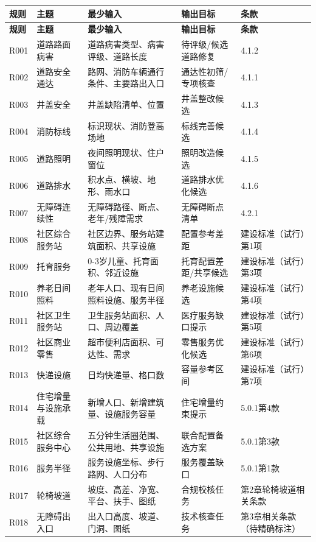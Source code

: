 \documentclass[UTF8,11pt,fontset=windows]{ctexart}
\begin{document}
{\small
\begin{longtable}{@{}L{13mm}L{32mm}L{47mm}L{43mm}L{19mm}@{}}
\toprule
\textbf{规则} & \textbf{主题} & \textbf{最少输入} & \textbf{输出目标} & \textbf{条款}\\
\midrule\endfirsthead
\toprule\textbf{规则} & \textbf{主题} & \textbf{最少输入} & \textbf{输出目标} & \textbf{条款}\\
\midrule\endhead
R001 & 道路路面病害 & 道路病害类型、病害评级、道路长度 & 待评级/候选道路修复 & 4.1.2\\
R002 & 道路安全通达 & 路网、消防车辆通行条件、主要路出入口 & 通达性初筛/专项核查 & 4.1.1\\
R003 & 井盖安全 & 井盖缺陷清单、位置 & 井盖整改候选 & 4.1.3\\
R004 & 消防标线 & 标识现状、消防登高场地 & 标线完善候选 & 4.1.4\\
R005 & 道路照明 & 夜间照明现状、住户窗位 & 照明改造候选 & 4.1.5\\
R006 & 道路排水 & 积水点、横坡、地形、雨水口 & 道路排水优化候选 & 4.1.6\\
R007 & 无障碍连续性 & 无障碍路径、断点、老年/残障需求 & 无障碍断点清单 & 4.2.1\\
R008 & 社区综合服务站 & 社区边界、服务站建筑面积、共享设施 & 配置参考差距 & 建设标准（试行）第1项\\
R009 & 托育服务 & 0-3岁儿童、托育面积、邻近设施 & 托育配置差距/共享候选 & 建设标准（试行）第3项\\
R010 & 养老日间照料 & 老年人口、现有日间照料设施、服务半径 & 养老设施候选 & 建设标准（试行）第4项\\
R011 & 社区卫生服务站 & 卫生服务站面积、人口、周边覆盖 & 医疗服务缺口提示 & 建设标准（试行）第5项\\
R012 & 社区商业零售 & 超市便利店面积、可达性、需求 & 零售服务优化候选 & 建设标准（试行）第6项\\
R013 & 快递设施 & 日均快递量、格口数 & 容量参考区间 & 建设标准（试行）第7项\\
R014 & 住宅增量与设施承载 & 新增人口、新增建筑量、设施服务容量 & 住宅增量约束提示 & 5.0.1第4款\\
R015 & 社区综合服务中心 & 五分钟生活圈范围、公共用地、共享设施 & 联合配置备选方案 & 5.0.1第3款\\
R016 & 服务半径 & 服务设施坐标、步行路网、人口分布 & 服务覆盖缺口 & 5.0.1第1款\\
R017 & 轮椅坡道 & 坡度、高差、净宽、平台、扶手、图纸 & 合规校核任务 & 第2章轮椅坡道相关条款\\
R018 & 无障碍出入口 & 出入口高度、坡道、门洞、图纸 & 技术核查任务 & 第3章相关条款（待精确标注）\\

\end{longtable}}
\end{document}
